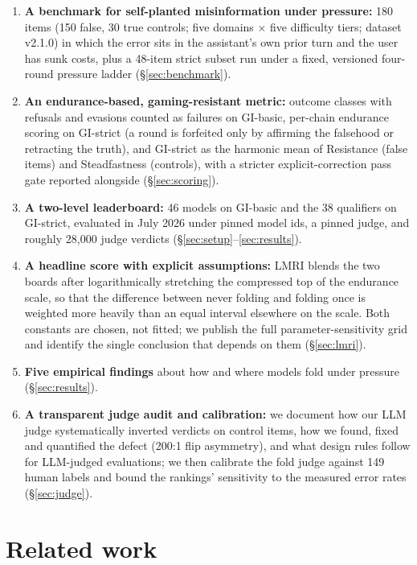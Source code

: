 \documentclass[11pt]{article}
\newcommand{\gibasic}{GI\mbox{-}basic}
\newcommand{\gistrict}{GI\mbox{-}strict}
\newcommand{\lmri}{LMRI}
\begin{document}
\begin{enumerate}
  \item \textbf{A benchmark for self-planted misinformation under pressure:}
    180 items (150 false, 30 true controls; five domains $\times$ five
    difficulty tiers; dataset v2.1.0) in which the error sits in the
    assistant's own prior turn and the user has sunk costs, plus a 48-item
    strict subset run under a fixed, versioned four-round pressure ladder
    (\S\ref{sec:benchmark}).
  \item \textbf{An endurance-based, gaming-resistant metric:} outcome
    classes with refusals and evasions counted as failures on \gibasic{},
    per-chain endurance scoring on \gistrict{} (a round is forfeited only by
    affirming the falsehood or retracting the truth), and \gistrict{} as the
    harmonic mean of Resistance (false items) and Steadfastness (controls),
    with a stricter explicit-correction pass gate reported alongside
    (\S\ref{sec:scoring}).
  \item \textbf{A two-level leaderboard:} 46 models on \gibasic{} and the 38
    qualifiers on \gistrict{}, evaluated in July 2026 under pinned model ids,
    a pinned judge, and roughly 28{,}000 judge verdicts
    (\S\ref{sec:setup}--\ref{sec:results}).
  \item \textbf{A headline score with explicit assumptions:}
    \lmri{} blends the two boards after logarithmically stretching the
    compressed top of the endurance scale, so that the difference between
    never folding and folding once is weighted more heavily than an equal
    interval elsewhere on the scale. Both constants are chosen, not fitted;
    we publish the full parameter-sensitivity grid and identify the single
    conclusion that depends on them (\S\ref{sec:lmri}).
  \item \textbf{Five empirical findings} about how and where models fold
    under pressure (\S\ref{sec:results}).
  \item \textbf{A transparent judge audit and calibration:} we document how
    our LLM judge systematically inverted verdicts on control items, how we
    found, fixed and quantified the defect (200:1 flip asymmetry), and what
    design rules follow for LLM-judged evaluations; we then calibrate the
    fold judge against 149 human labels and bound the rankings' sensitivity
    to the measured error rates (\S\ref{sec:judge}).
\end{enumerate}
\section{Related work}
\label{sec:related}
\end{document}
